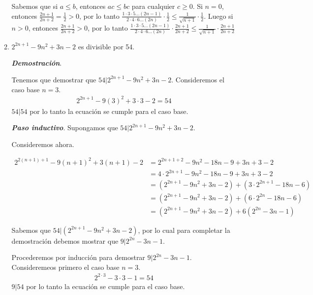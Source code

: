 \documentclass{report}
\begin{document}
\begin{enumerate}
\begin{enumerate}
            Sabemos que si $a \leq b$, entonces $ac \leq bc$ para cualquier $c \geq 0$. Si $n = 0$, entonces $\frac{2n+1}{2n+2} = \frac{1}{2} > 0$, por lo tanto $\frac{1 \cdot 3 \cdot 5 \ldots (2n-1)}{2 \cdot 4 \cdot 6 \ldots (2n)} \cdot \frac{1}{2} \leq \frac{1}{\sqrt{n+1}}\cdot \frac{1}{2}$. Luego si $n > 0$, entonces $\frac{2n+1}{2n+2} > 0$, por lo tanto $\frac{1 \cdot 3 \cdot 5 \ldots (2n-1)}{2 \cdot 4 \cdot 6 \ldots (2n)} \cdot \frac{2n+1}{2n+2} \leq \frac{1}{\sqrt{n+1}}\cdot \frac{2n+1}{2n+2}$

            \item $2^{2n+1} - 9n^2 + 3n - 2$ es divisible por 54.

            \textit{\textbf{Demostración}}.

            Tenemos que demostrar que $54|2^{2n+1} - 9n^2 + 3n - 2$. Consideremos el caso base $n=3$.
            \begin{align*}
                2^{2n+1} -9(3)^2+3\cdot 3 -2 = 54
            \end{align*}
            $54|54$ por lo tanto la ecuación se cumple para el caso base.

            \textit{\textbf{Paso inductivo}}. Supongamos que $54|2^{2n+1} - 9n^2 + 3n - 2$.

            Consideremos ahora.

            \begin{align*}
                2^{2(n+1)+1} - 9(n+1)^2 + 3(n+1) - 2 &= 2^{2n+1 +2} - 9n^2 - 18n -9 + 3n+3 - 2\\
                &= 4 \cdot 2^{2n+1} - 9n^2 - 18n -9 + 3n+3 - 2\\
                &= (2^{2n+1} - 9n^2 +3n -2) + (3 \cdot 2^{2n+1} -18n -6)\\
                &= (2^{2n+1} - 9n^2 +3n -2) + (6 \cdot 2^{2n} -18n -6)\\
                &= (2^{2n+1} - 9n^2 +3n -2) + 6(2^{2n} -3n -1)
            \end{align*}

            Sabemos que $54|(2^{2n+1} - 9n^2 +3n -2)$, por lo cual para completar la demostración debemos mostrar que $9|2^{2n} -3n -1$.

            Procederemos por inducción para demostrar $9|2^{2n} -3n -1$. Consideremeos primero el caso base $n=3$.
            \begin{align*}
                2^{2 \cdot 3} - 3 \cdot 3 - 1 = 54
            \end{align*}
            $9|54$ por lo tanto la ecuación se cumple para el caso base.


\end{enumerate}
\end{enumerate}
\end{document}
